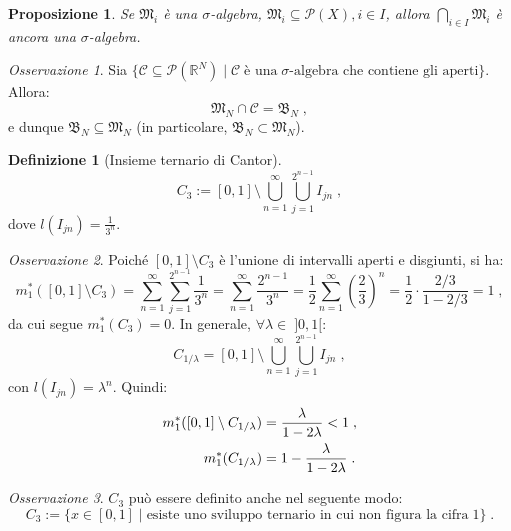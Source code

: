 \documentclass[a4paper,12pt]{report}
\theoremstyle{plain}
\newtheorem{prop}{Proposizione}[section]
\theoremstyle{definition}
\newtheorem{defn}{Definizione}[section]
\theoremstyle{remark}
\newtheorem{oss}{Osservazione}[section]
\numberwithin{equation}{section}
\begin{document}
\begin{prop} Se $\mathfrak{M}_i$ è una $\sigma$-algebra, $\mathfrak{M}_i\subseteq \mathcal{P}(X), i \in I$, allora $\bigcap_{i \in I} \mathfrak{M}_i$ è ancora una $\sigma$-algebra.
\end{prop}
\begin{oss} Sia $\{\mathcal{C}\subseteq\mathcal{P}(\mathbb{R}^N)\;|\; \mathcal{C}\;\mbox{è una}\;\sigma\mbox{-algebra che contiene gli aperti}\}$. Allora:
\begin{equation}
\mathfrak{M}_N\cap \mathcal{C}=\mathfrak{B}_N\;,
\end{equation}
e dunque $\mathfrak{B}_N \subseteq \mathfrak{M}_N$ (in particolare, $\mathfrak{B}_N \subset \mathfrak{M}_N$).
\end{oss}
\begin{defn}[Insieme ternario di Cantor]
\begin{equation}
C_3:=[0,1]\setminus \bigcup_{n=1}^{\infty}\bigcup_{j=1}^{2^{n-1}} I_{jn}\;,
\end{equation}
dove $l(I_{jn})=\frac{1}{3^n}$.
\end{defn}
\begin{oss} Poiché $[0,1]\setminus C_3$ è l'unione di intervalli aperti e disgiunti, si ha:
\begin{equation}
m_1^*([0,1]\setminus C_3)=\sum_{n=1}^{\infty}\sum_{j=1}^{2^{n-1}} \frac{1}{3^n}=\sum_{n=1}^{\infty}\frac{2^{n-1}}{3^n}=\frac{1}{2}
\sum_{n=1}^{\infty}\left(\frac{2}{3}\right)^n=\frac{1}{2}\cdot\frac{2/3}{1-2/3}=1\;,
\end{equation}
da cui segue $m_1^*(C_3)=0$. In generale, $\forall \lambda \in\;]0,1[$:
\begin{equation}
C_{1/\lambda}=[0,1]\setminus \bigcup_{n=1}^{\infty}\bigcup_{j=1}^{2^{n-1}} I_{jn}\;,
\end{equation}
con $l(I_{jn})=\lambda^n$. Quindi:
\begin{align}
m_1^*([0,1]\setminus C_{1/\lambda}) &= \frac{\lambda}{1-2\lambda}< 1\;, \notag \\
m_1^*(C_{1/\lambda})&=1-\frac{\lambda}{1-2\lambda}\;.
\end{align}
\end{oss}
\begin{oss} $C_3$ può essere definito anche nel seguente modo:
\begin{equation}
C_3:=\{x \in [0,1]\;|\;\mbox{esiste uno sviluppo ternario in cui non figura la cifra}\;1\}\;.
\end{equation}
\end{oss}
\end{document}
